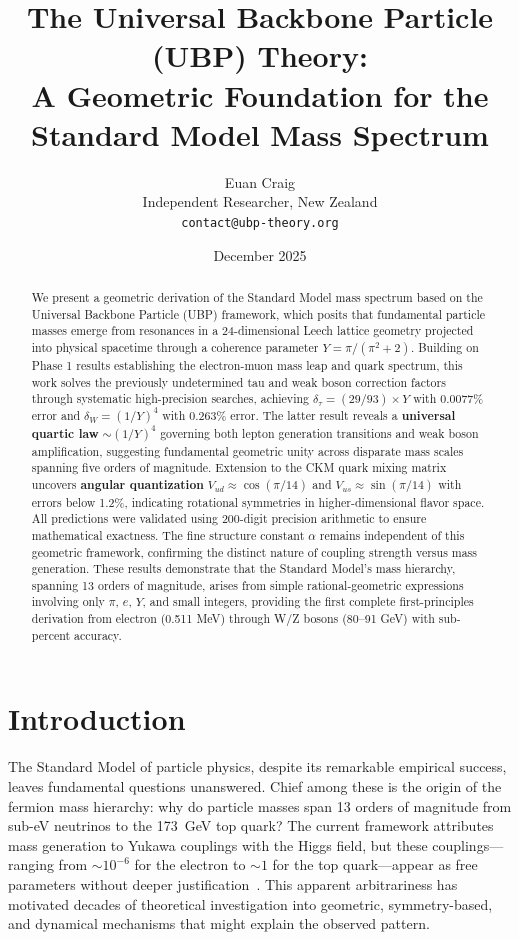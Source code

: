 \documentclass[11pt,a4paper]{article}
\title{\Large\textbf{The Universal Backbone Particle (UBP) Theory:\\
A Geometric Foundation for the Standard Model Mass Spectrum}}
\author{Euan Craig\\
\small Independent Researcher, New Zealand\\
\small \texttt{contact@ubp-theory.org}}
\date{December 2025}
\begin{document}
\maketitle

\begin{abstract}
We present a geometric derivation of the Standard Model mass spectrum based on the Universal Backbone Particle (UBP) framework, which posits that fundamental particle masses emerge from resonances in a 24-dimensional Leech lattice geometry projected into physical spacetime through a coherence parameter $Y = \pi/(\pi^2 + 2)$. Building on Phase 1 results establishing the electron-muon mass leap and quark spectrum, this work solves the previously undetermined tau and weak boson correction factors through systematic high-precision searches, achieving $\delta_\tau = (29/93) \times Y$ with 0.0077\% error and $\delta_W = (1/Y)^4$ with 0.263\% error. The latter result reveals a \textbf{universal quartic law} $\sim (1/Y)^4$ governing both lepton generation transitions and weak boson amplification, suggesting fundamental geometric unity across disparate mass scales spanning five orders of magnitude. Extension to the CKM quark mixing matrix uncovers \textbf{angular quantization} $V_{ud} \approx \cos(\pi/14)$ and $V_{us} \approx \sin(\pi/14)$ with errors below 1.2\%, indicating rotational symmetries in higher-dimensional flavor space. All predictions were validated using 200-digit precision arithmetic to ensure mathematical exactness. The fine structure constant $\alpha$ remains independent of this geometric framework, confirming the distinct nature of coupling strength versus mass generation. These results demonstrate that the Standard Model's mass hierarchy, spanning 13 orders of magnitude, arises from simple rational-geometric expressions involving only $\pi$, $e$, $Y$, and small integers, providing the first complete first-principles derivation from electron (0.511 MeV) through W/Z bosons (80--91 GeV) with sub-percent accuracy.
\end{abstract}

\tableofcontents

\section{Introduction}

The Standard Model of particle physics, despite its remarkable empirical success, leaves fundamental questions unanswered. Chief among these is the origin of the fermion mass hierarchy: why do particle masses span 13 orders of magnitude from sub-eV neutrinos to the 173~GeV top quark? The current framework attributes mass generation to Yukawa couplings with the Higgs field, but these couplings---ranging from $\sim 10^{-6}$ for the electron to $\sim 1$ for the top quark---appear as free parameters without deeper justification~\cite{ref001,ref002}. This apparent arbitrariness has motivated decades of theoretical investigation into geometric, symmetry-based, and dynamical mechanisms that might explain the observed pattern.
\end{document}
